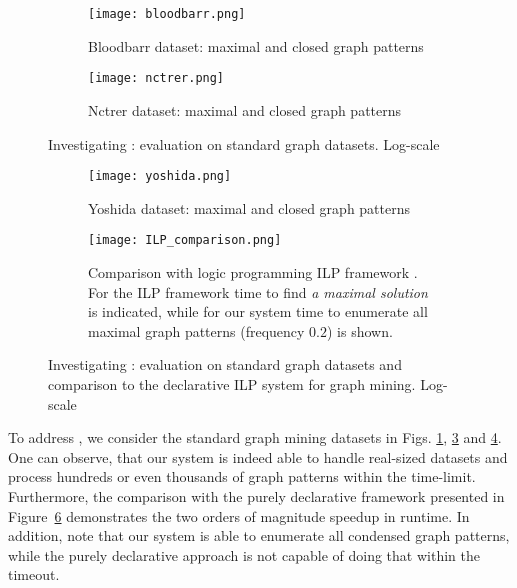 \begin{figure}[tb]
  \centering
  \begin{subfigure}[t]{\textwidth}
  \centering
   \texttt{[image: bloodbarr.png]}
   \caption{Bloodbarr dataset: maximal and closed graph patterns}
    \label{fig:bloodbarr}
  \end{subfigure}
  \begin{subfigure}[t]{\textwidth}
  \centering
   \texttt{[image: nctrer.png]}
   \caption{Nctrer dataset: maximal and closed graph patterns}
    \label{fig:nctrer}
  \end{subfigure}
  \caption{Investigating \qfive: evaluation on standard graph datasets. Log-scale}
\end{figure}
\begin{figure}[tb]
  \centering
  \begin{subfigure}[t]{\textwidth}
  \centering
   \texttt{[image: yoshida.png]}
   \caption{Yoshida dataset: maximal and closed graph patterns}
    \label{fig:yoshida}
  \end{subfigure}
  \begin{subfigure}[t]{\textwidth}
  \centering
   \texttt{[image: ILP\_comparison.png]}
   \caption{Comparison with logic programming ILP framework \parencite{query_mining_ilp}. For the ILP framework time to find \textit{a maximal solution} is indicated, while for our system  time to enumerate all maximal graph patterns (frequency $0.2$) is shown.}
   \label{fig:ilp_comparison}
  \end{subfigure}
  \caption{Investigating \qfive: evaluation on standard graph datasets and comparison to the declarative ILP system for graph mining. Log-scale}
\end{figure}

To address \qfive, we consider the standard graph mining datasets 
in Figs. \ref{fig:bloodbarr}, \ref{fig:nctrer} and \ref{fig:yoshida}. One can observe, that our system is indeed able to handle real-sized datasets and process hundreds %
or even thousands of graph patterns within the time-limit. Furthermore, the comparison with the purely declarative framework presented in Figure~\ref{fig:ilp_comparison} %
demonstrates the two orders of magnitude speedup in runtime. In addition, note that our system is able to enumerate all condensed graph patterns, while the purely declarative approach is not capable of doing that within the timeout.

